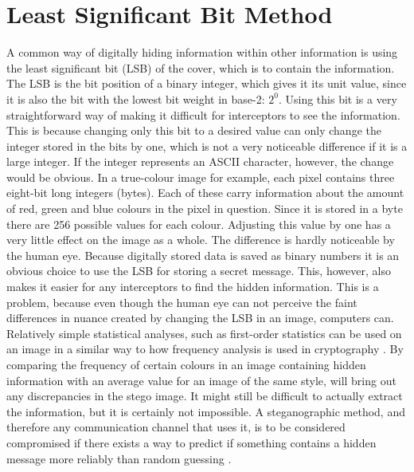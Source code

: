 \section{Least Significant Bit Method}
A common way of digitally hiding information within other information is using the least significant bit (LSB) of the cover, which is to contain the information. 
The LSB is the bit position of a binary integer, which gives it its unit value, since it is also the bit with the lowest bit weight in base-2: $2^0$.
Using this bit is a very straightforward way of making it difficult for interceptors to see the information. This is because changing only this bit to a desired value can only change the integer stored in the bits by one, which is not a very noticeable difference if it is a large integer. If the integer represents an ASCII character, however, the change would be obvious.
In a true-colour image for example, each pixel contains three eight-bit long integers (bytes). Each of these carry information about the amount of red, green and blue colours in the pixel in question.
Since it is stored in a byte there are 256 possible values for each colour. Adjusting this value by one has a very little effect on the image as a whole. The difference is hardly noticeable by the human eye.
Because digitally stored data is saved as binary numbers it is an obvious choice to use the LSB for storing a secret message. This, however, also makes it easier for any interceptors to find the hidden information.
This is a problem, because even though the human eye can not perceive the faint differences in nuance created by changing the LSB in an image, computers can. 
Relatively simple statistical analyses, such as first-order statistics can be used on an image in a similar way to how frequency analysis is used in cryptography \citep{Hetzl2005}. 
By comparing the frequency of certain colours in an image containing hidden information with an average value for an image of the same style, will bring out any discrepancies in the stego image. 
It might still be difficult to actually extract the information, but it is certainly not impossible. A steganographic method, and therefore any communication channel that uses it, is to be considered compromised if there exists a way to predict if something contains a hidden message more reliably than random guessing \citep{Bohme2004}.